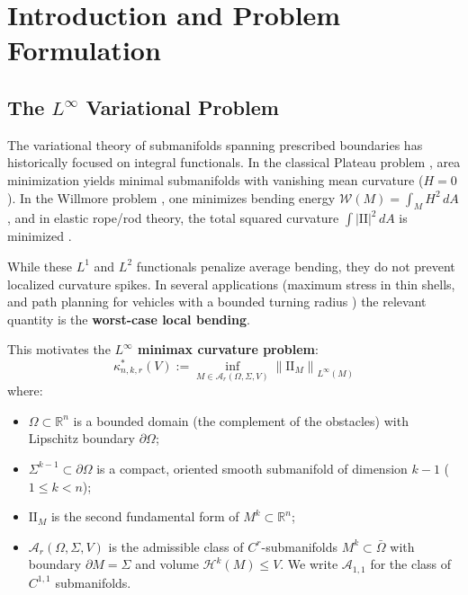 \documentclass[11pt,reqno]{amsart}
\theoremstyle{definition}
\providecommand{\R}{\mathbb{R}}
\providecommand{\II}{\mathrm{I\!I}}
\providecommand{\Hsn}{\mathcal{H}}
\numberwithin{equation}{section}
\providecommand{\II}{\mathrm{II}}
\providecommand{\R}{\mathbb{R}}
\providecommand{\Hsn}{\mathcal{H}}
\begin{document}
\maketitle

\tableofcontents
\newpage

\section{Introduction and Problem Formulation}

\subsection{The \texorpdfstring{$L^\infty$}{L\textasciicircum\textbackslash{}infty} Variational Problem}
The variational theory of submanifolds spanning prescribed boundaries has historically focused on integral functionals. In the classical Plateau problem \cite{douglas1931, rado1930}, area minimization yields minimal submanifolds with vanishing mean curvature ($H = 0$). In the Willmore problem \cite{willmore1965, simon1993, riviere2008}, one minimizes bending energy $\mathcal{W}(M) = \int_M H^2 \, dA$, and in elastic rope/rod theory, the total squared curvature $\int |\II|^2 \, dA$ is minimized \cite{langer1984}.

While these $L^1$ and $L^2$ functionals penalize average bending, they do not prevent localized curvature spikes. In several applications (maximum stress in thin shells, and path planning for vehicles with a bounded turning radius \cite{dubins1957, sussmann1995, chitsaz2007}) the relevant quantity is the \textbf{worst-case local bending}.

This motivates the \textbf{$L^\infty$ minimax curvature problem}:
\begin{equation}
\label{eq:variational_problem}
\kappa^*_{n,k,r}(V) := \inf_{M \in \mathcal{A}_r(\Omega, \Sigma, V)} \left\| \II_M \right\|_{L^\infty(M)}
\end{equation}
where:
\begin{itemize}
    \item $\Omega \subset \R^n$ is a bounded domain (the complement of the obstacles) with Lipschitz boundary $\partial\Omega$;
    \item $\Sigma^{k-1} \subset \partial\Omega$ is a compact, oriented smooth submanifold of dimension $k-1$ ($1 \le k < n$);
    \item $\II_M$ is the second fundamental form of $M^k \subset \R^n$;
    \item $\mathcal{A}_r(\Omega, \Sigma, V)$ is the admissible class of $C^r$-submanifolds $M^k \subset \bar{\Omega}$ with boundary $\partial M = \Sigma$ and volume $\Hsn^k(M) \le V$. We write $\mathcal{A}_{1,1}$ for the class of $C^{1,1}$ submanifolds.
\end{itemize}
\end{document}
